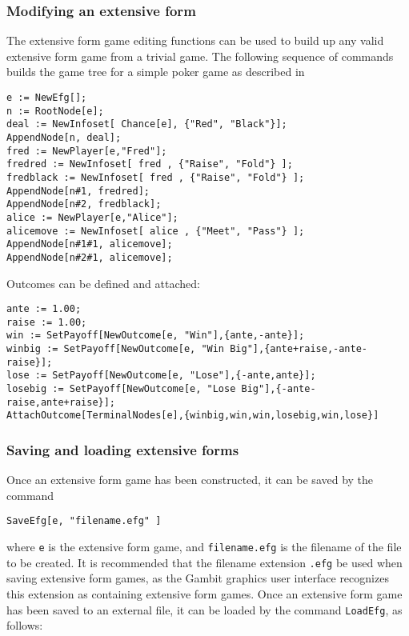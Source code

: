 \subsubsection{Modifying an extensive form}

The extensive form game editing functions can be used to build up any
valid extensive form game from a trivial game.  The following sequence
of commands builds the game tree for a simple poker game as described
in \cite{Mye:91}

\begin{verbatim}
e := NewEfg[];
n := RootNode[e];
deal := NewInfoset[ Chance[e], {"Red", "Black"}];
AppendNode[n, deal];
fred := NewPlayer[e,"Fred"];
fredred := NewInfoset[ fred , {"Raise", "Fold"} ];
fredblack := NewInfoset[ fred , {"Raise", "Fold"} ];
AppendNode[n#1, fredred];
AppendNode[n#2, fredblack];
alice := NewPlayer[e,"Alice"];
alicemove := NewInfoset[ alice , {"Meet", "Pass"} ];
AppendNode[n#1#1, alicemove]; 
AppendNode[n#2#1, alicemove]; 
\end{verbatim}

\noindent Outcomes can be defined and attached:

\begin{verbatim}
ante := 1.00;
raise := 1.00;
win := SetPayoff[NewOutcome[e, "Win"],{ante,-ante}];
winbig := SetPayoff[NewOutcome[e, "Win Big"],{ante+raise,-ante-raise}];
lose := SetPayoff[NewOutcome[e, "Lose"],{-ante,ante}];
losebig := SetPayoff[NewOutcome[e, "Lose Big"],{-ante-raise,ante+raise}];
AttachOutcome[TerminalNodes[e],{winbig,win,win,losebig,win,lose}]
\end{verbatim}

\subsubsection{Saving and loading extensive forms}

Once an extensive form game has been constructed, it can be saved by
the command 

\begin{verbatim}
SaveEfg[e, "filename.efg" ]
\end{verbatim}

\noindent where \verb+e+ is the extensive form game, and
\verb+filename.efg+ is the filename of the file to be created.  It is
recommended that the filename extension \verb+.efg+ be used when
saving extensive form games, as the Gambit graphics user interface
recognizes this extension as containing extensive form games.  Once an
extensive form game has been saved to an external file, it can be
loaded by the command \verb+LoadEfg+, as follows:


